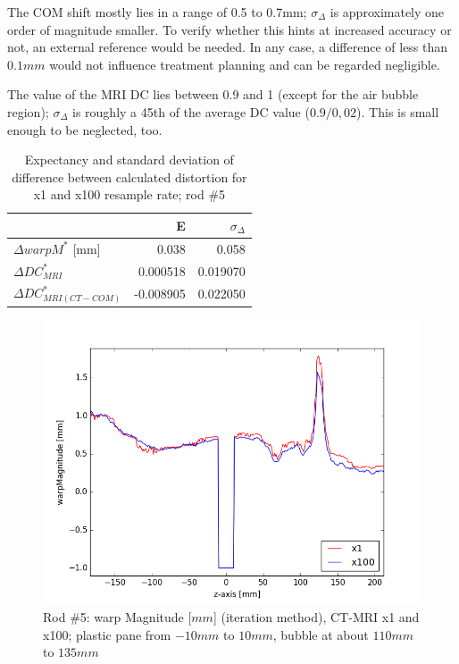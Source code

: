 The COM shift mostly lies in a range of 0.5 to 0.7mm; $\sigma_\Delta$ is approximately one order of magnitude smaller.
To verify whether this hints at increased accuracy or not, an external reference would be needed.
In any case, a difference of less than $0.1mm$ would not influence treatment planning and can be regarded negligible.

The value of the MRI DC lies between 0.9 and 1 (except for the air bubble region); $\sigma_\Delta$ is roughly a 45th of the average DC value ($0.9/0,02$). This is small enough to be neglected, too.

\begin{table}[!tbh]
 \centering
\begin{tabular}{l|rr}
                    & E         & $\sigma_\Delta$   \\ \hline
$\Delta warpM^*$ [mm]  & 0.038     & 0.058    \\
$\Delta DC^*_{MRI}$         & 0.000518  & 0.019070 \\
$\Delta DC^*_{MRI(CT-COM)}$ & -0.008905 & 0.022050
\end{tabular}
\caption{Expectancy and standard deviation of difference between calculated distortion for x1 and x100 resample rate; rod \#5}
\label{tab:Delta-resample_5}
\end{table}

\begin{figure}[!tbh]
    \centering
    \includegraphics[scale=0.6]{../fig/python/ph2/warp/warpMagnitude_x1-100_iter.png}
    \caption{Rod \#5: warp Magnitude [$mm$] (iteration method), CT-MRI x1 and x100; plastic pane from $-10mm$ to $10mm$, bubble at about $110mm$ to $135mm$}
    \label{fig:ph2_warpMagnitude_x1-100}
\end{figure}

